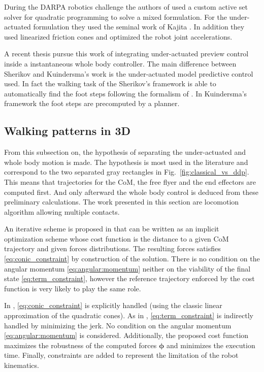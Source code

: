 During the DARPA robotics challenge the authors of \cite{kuindersma:icra:2014} used a custom active set solver for quadratic programming to solve a mixed formulation.
For the under-actuated formulation they used the seminal work of Kajita \cite{Kajita:icra:2003}.
In addition they used linearized friction cones and optimized the robot joint accelerations.

A recent thesis \cite{phdthesis:sherikov:2016} pursue this work of integrating under-actuated preview control inside a instantaneous whole body controller.
The main difference between Sherikov and Kuindersma's work is the under-actuated model predictive control used.
In fact the walking task of the Sherikov's framework is able to automatically find the foot steps following the formalism of \cite{herdt:iros:2010}.
In Kuindersma's framework the foot steps are precomputed by a planner.

\subsection*{Walking patterns in 3D}

From this subsection on, the hypothesis of separating the under-actuated and whole body motion is made.
The hypothesis is most used in the literature and correspond to the two separated gray rectangles in Fig.~\ref{fig:classical_vs_ddp}.
This means that trajectories for the CoM, the free flyer and the end effectors are computed first.
And only afterward the whole body control is deduced from these preliminary calculations.
The work presented in this section are locomotion algorithm allowing multiple contacts.

An iterative scheme is proposed in \cite{Hirukawa:icra:2007} that can be written as an implicit optimization scheme whose cost function is the distance to a given CoM trajectory and given forces distributions. The resulting forces satisfies \eqref{eq:conic_constraint} by construction of the solution. There is no condition on the angular momentum \eqref{eq:angular:momentum} neither on the viability of the final state \eqref{eq:term_constraint}, however the reference trajectory enforced by the cost function is very likely to play the same role.

In \cite{qiu_dhm11}, \eqref{eq:conic_constraint} is explicitly handled (using the classic linear approximation of the quadratic cones). As in \cite{perrin_isrr15}, \eqref{eq:term_constraint} is indirectly handled by minimizing the jerk. No condition on the angular momentum \eqref{eq:angular:momentum} is considered. Additionally, the proposed cost function maximizes the robustness of the computed forces $\bm\phi$ and minimizes the execution time. Finally, constraints are added to represent the limitation of the robot kinematics.

